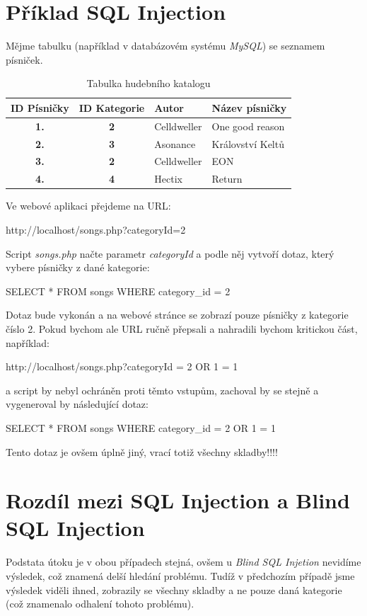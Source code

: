 \documentclass[12pt, a4paper]{report}
\begin{document}
\section{Příklad SQL Injection}
Mějme tabulku (například v databázovém systému \textit{MySQL}) se seznamem písniček.
\begin{table}[!h]
\centering
\begin{tabular}{|c|c|l|l|}
\hline
\bf ID Písničky & \bf ID Kategorie & \bf Autor & \bf Název písničky \\
\hline
\hline
\bf 1. & \bf 2 & Celldweller & One good reason \\
\hline
\bf 2. & \bf 3 & Asonance & Království Keltů \\
\hline
\bf 3. & \bf 2 & Celldweller & EON \\
\hline
\bf 4. & \bf 4 & Hectix & Return \\
\hline
\end{tabular}
\label{tab:haz}
\caption{Tabulka hudebního katalogu}
\end{table}
\newline
Ve webové aplikaci přejdeme na URL:
\begin{center}
http://localhost/songs.php?categoryId=2
\end{center}
Script \textit{songs.php} načte parametr \textit{categoryId} a podle něj vytvoří dotaz, který vybere písničky z dané kategorie:
\begin{center}
SELECT * FROM songs WHERE category\_id = 2
\end{center}
Dotaz bude vykonán a na webové stránce se zobrazí pouze písničky z kategorie číslo 2. Pokud bychom ale URL ručně přepsali a nahradili bychom kritickou část, například:
\begin{center}
http://localhost/songs.php?categoryId = 2 OR 1 = 1
\end{center}
a script by nebyl ochráněn proti těmto  vstupům, zachoval by se stejně a vygeneroval by následující dotaz:
\begin{center}
SELECT * FROM songs WHERE category\_id = 2 OR 1 = 1
\end{center}
Tento dotaz je ovšem úplně jiný, vrací totiž všechny skladby!!!!

\section{Rozdíl mezi SQL Injection a Blind SQL Injection}
Podstata útoku je v obou případech stejná, ovšem u \textit{Blind SQL Injetion} nevidíme výsledek, což znamená delší hledání problému. Tudíž v předchozím případě jsme výsledek viděli ihned, zobrazily se všechny skladby a ne pouze daná kategorie (což znamenalo odhalení tohoto problému). 
\end{document}
